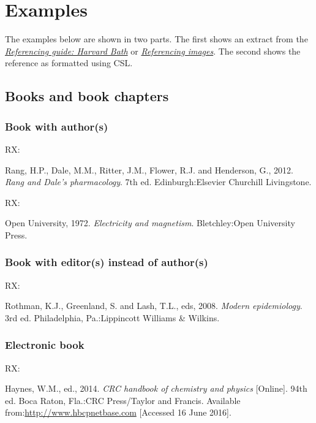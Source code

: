 \section{Examples}

The examples below are shown in two parts.
The first shows an extract from the
\href{https://library.bath.ac.uk/referencing/harvard-bath}{\emph{Referencing guide: Harvard Bath}} or
\href{https://library.bath.ac.uk/images/referencing}{\emph{Referencing images}}.
The second shows the reference as formatted using CSL.

\subsection{Books and book chapters}

\subsubsection*{Book with author(s)}

RX: \cite{rang.etal2012rdp}

Rang, H.P., Dale, M.M., Ritter, J.M., Flower, R.J. and Henderson, G., 2012. \emph{Rang and Dale's pharmacology}. 7th ed. Edinburgh:\@ Elsevier Churchill Livingstone.


RX: \cite{ou1972em}

Open University, 1972. \emph{Electricity and magnetism}. Bletchley:\@ Open University Press.



\subsubsection*{Book with editor(s) instead of author(s)}

RX: \cite{rothman.etal2008me}

Rothman, K.J., Greenland, S. and Lash, T.L., eds, 2008. \emph{Modern epidemiology}. 3rd ed. Philadelphia, Pa.:\@ Lippincott Williams \& Wilkins.



\subsubsection*{Electronic book}

RX: \cite{haynes2014crc}

Haynes, W.M., ed.\@, 2014. \emph{CRC handbook of chemistry and physics} [Online]. 94th ed. Boca Raton, Fla.:\@ CRC Press/Taylor and Francis. Available from:\@ \url{http://www.hbcpnetbase.com} [Accessed 16 June 2016].


